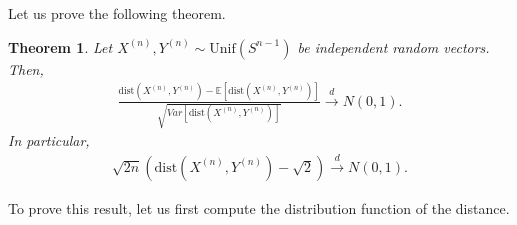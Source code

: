 \documentclass[10pt]{amsart}
\newtheorem{theorem}{Theorem}[section]
\newcounter{theor}
\def\dist{\text{dist}}
\numberwithin{equation}{section}
\begin{document}
Let us prove the following theorem.
\begin{theorem}
\label{Thm:CLThypersphere}
Let $X^{(n)},Y^{(n)} \sim \text{Unif} (S^{n-1})$ be independent random vectors. Then,
\begin{align*}
  \frac{ \dist(X^{(n)},Y^{(n)}) - \mathbb{E} [\dist(X^{(n)},Y^{(n)})]}{ \sqrt{ Var[\dist(X^{(n)},Y^{(n)})]} } \overset{d}{\to} N(0,1) .
\end{align*}
In particular, 
\begin{align*}
\sqrt{2n} \left( \dist(X^{(n)},Y^{(n)}) - \sqrt{2} \right) \overset{d}{\to}  N(0,1) .
\end{align*}
\end{theorem}

To prove this result, let us first compute the distribution function of the distance.
\end{document}
